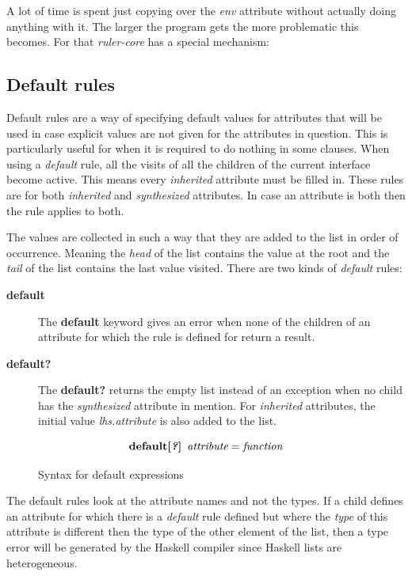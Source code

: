 \documentclass[twoside, titlepage, openright, a4paper]{book}
\newcommand{\rcore}{\emph{ruler-core }}
\begin{document}
A lot of time is spent just copying over the \emph{env} attribute without actually doing anything with it. The larger the program gets the more problematic this becomes. For that \rcore has a special mechanism:

\subsection{Default rules}
Default rules are a way of specifying default values for attributes that will be used in case explicit values are not given for the attributes in question. This is particularly useful for when it is required to do nothing in some clauses.
When using a \emph{default} rule, all the visits of all the children of the current interface become active. This means every \emph{inherited} attribute must be filled in.
These rules are for both \emph{inherited} and \emph{synthesized} attributes. In case an attribute is both then the rule applies to both. 

The values are collected in such a way that they are added to the list in order of occurrence. Meaning the \emph{head} of the list contains the value at the root and the \emph{tail} of the list contains the last value visited. There are two kinds of \emph{default} rules:
\begin{description}
\item[\textbf{default}] { The \textbf{default} keyword gives an error when none of the children of an attribute for which the rule is defined for return a result. }
\item[\textbf{default?}] { The \textbf{default?} returns the empty list instead of an exception when no child has the \emph{synthesized} attribute in mention. For \emph{inherited} attributes, the initial value \emph{lhs.attribute} is also added to the list. }
\end{description}

\begin{figure}[h!]
\[
\textbf{default[\textit{?}]} \hspace{5pt} \emph{attribute} = \emph{function}
\]
\caption{Syntax for default expressions}
\label{default:syntax}
\end{figure}

The default rules look at the attribute names and not the types. If a child defines an attribute for which there is a \emph{default} rule defined but where the \emph{type} of this attribute is different then the type of the other element of the list, then a type error will be generated by the Haskell compiler since Haskell lists are heterogeneous.
\end{document}
